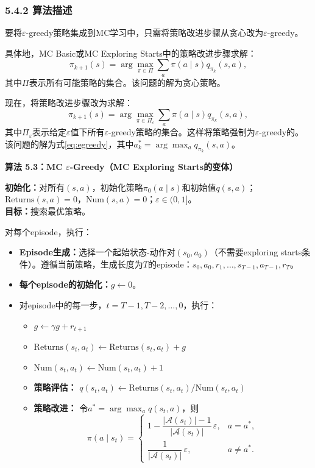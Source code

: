 \documentclass[UTF8]{article}
\begin{document}
\subsubsection*{5.4.2 算法描述}

要将$\varepsilon$-greedy策略集成到MC学习中，只需将策略改进步骤从贪心改为$\varepsilon$-greedy。

具体地，MC Basic或MC Exploring Starts中的策略改进步骤求解：
\[
\pi_{k+1}(s) = \arg\max_{\pi \in \Pi} \sum_a \pi(a \mid s) q_{\pi_k}(s,a),
\]
其中$\Pi$表示所有可能策略的集合。该问题的解为贪心策略。

现在，将策略改进步骤改为求解：
\[
\pi_{k+1}(s) = \arg\max_{\pi \in \Pi_\varepsilon} \sum_a \pi(a \mid s) q_{\pi_k}(s,a),
\]
其中$\Pi_\varepsilon$表示给定$\varepsilon$值下所有$\varepsilon$-greedy策略的集合。这样将策略强制为$\varepsilon$-greedy的。该问题的解为式\eqref{eq:egreedy}，其中$a_k^* = \arg\max_a q_{\pi_k}(s,a)$。

\begin{definitionbox}
    \textbf{算法 5.3：MC $\varepsilon$-Greedy（MC Exploring Starts的变体）}

    \textbf{初始化：}对所有$(s,a)$，初始化策略$\pi_0(a \mid s)$和初始值$q(s,a)$；\\
    $\text{Returns}(s,a) = 0$，$\text{Num}(s,a) = 0$；$\varepsilon \in (0,1]$。\\
    \textbf{目标：}搜索最优策略。

    对每个episode，执行：
    \begin{itemize}
        \item \textbf{Episode生成：}选择一个起始状态-动作对$(s_0, a_0)$（不需要exploring starts条件）。遵循当前策略，生成长度为$T$的episode：$s_0, a_0, r_1, \ldots, s_{T-1}, a_{T-1}, r_T$。
        \item \textbf{每个episode的初始化：}$g \leftarrow 0$。
        \item 对episode中的每一步，$t = T-1, T-2, \ldots, 0$，执行：
        \begin{itemize}
            \item $g \leftarrow \gamma g + r_{t+1}$
            \item $\text{Returns}(s_t, a_t) \leftarrow \text{Returns}(s_t, a_t) + g$
            \item $\text{Num}(s_t, a_t) \leftarrow \text{Num}(s_t, a_t) + 1$
            \item \textbf{策略评估：}
            $q(s_t, a_t) \leftarrow \text{Returns}(s_t, a_t) / \text{Num}(s_t, a_t)$
            \item \textbf{策略改进：}
            令$a^* = \arg\max_a q(s_t, a)$，则
            \[
            \pi(a \mid s_t) =
            \begin{cases}
            1 - \dfrac{|\mathcal{A}(s_t)| - 1}{|\mathcal{A}(s_t)|} \,\varepsilon, & a = a^*, \\[10pt]
            \dfrac{1}{|\mathcal{A}(s_t)|} \,\varepsilon, & a \neq a^* .
            \end{cases}
            \]
        \end{itemize}
    \end{itemize}
\end{definitionbox}
\end{document}
